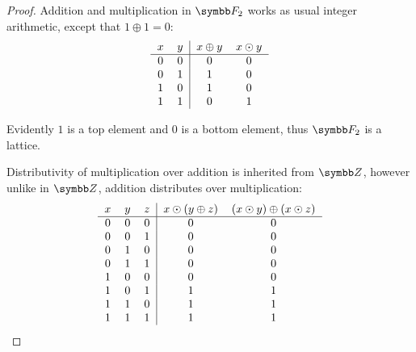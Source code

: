 \begin{proof}
  Addition and multiplication in \( \Fld_2 \) works as usual integer arithmetic, except that \( 1 \oplus 1 = 0 \):
  \begin{equation*}
    \begin{tabular}{c c | c c}
      \( x \)    & \( y \)    & \( x \oplus y \) & \( x \odot y \) \\
      \hline
      \( 0 \)    & \( 0 \)    & \( 0 \)          & \( 0 \) \\
      \( 0 \)    & \( 1 \)    & \( 1 \)          & \( 0 \) \\
      \( 1 \)    & \( 0 \)    & \( 1 \)          & \( 0 \) \\
      \( 1 \)    & \( 1 \)    & \( 0 \)          & \( 1 \)
    \end{tabular}
  \end{equation*}

  Evidently \( 1 \) is a top element and \( 0 \) is a bottom element, thus \( \Fld_2 \) is a lattice.

  Distributivity of multiplication over addition is inherited from \( \Z \), however unlike in \( \Z \), addition distributes over multiplication:
  \begin{equation*}
    \begin{tabular}{c c c | c c}
      \( x \)    & \( y \)    & \( z \)    & \(x \odot (y \oplus z) \) & \( (x \odot y) \oplus (x \odot z) \) \\
      \hline
      \( 0 \)    & \( 0 \)    & \( 0 \)    & \( 0 \)                   & \( 0 \) \\
      \( 0 \)    & \( 0 \)    & \( 1 \)    & \( 0 \)                   & \( 0 \) \\
      \( 0 \)    & \( 1 \)    & \( 0 \)    & \( 0 \)                   & \( 0 \) \\
      \( 0 \)    & \( 1 \)    & \( 1 \)    & \( 0 \)                   & \( 0 \) \\
      \( 1 \)    & \( 0 \)    & \( 0 \)    & \( 0 \)                   & \( 0 \) \\
      \( 1 \)    & \( 0 \)    & \( 1 \)    & \( 1 \)                   & \( 1 \) \\
      \( 1 \)    & \( 1 \)    & \( 0 \)    & \( 1 \)                   & \( 1 \) \\
      \( 1 \)    & \( 1 \)    & \( 1 \)    & \( 1 \)                   & \( 1 \)
    \end{tabular}
  \end{equation*}


\end{proof}
